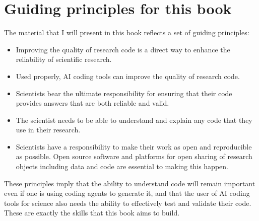 \section{Guiding principles for this book}

The material that I will present in this book reflects a set of guiding principles:

\begin{itemize}
\item Improving the quality of research code is a direct way to enhance the reliability of scientific research.
\item Used properly, AI coding tools can improve the quality of research code. 
\item Scientists bear the ultimate responsibility for ensuring that their code provides answers that are both reliable and valid.  
\item The scientist needs to be able to understand and explain any code that they use in their research.
\item Scientists have a responsibility to make their work as open and reproducible as possible.  Open source software and platforms for open sharing of research objects including data and code are essential to making this happen.
\end{itemize}

These principles imply that the ability to understand code will remain important even if one is using coding agents to generate it, and that the user of AI coding tools for science also needs the ability to effectively test and validate their code. These are exactly the skills that this book aims to build.